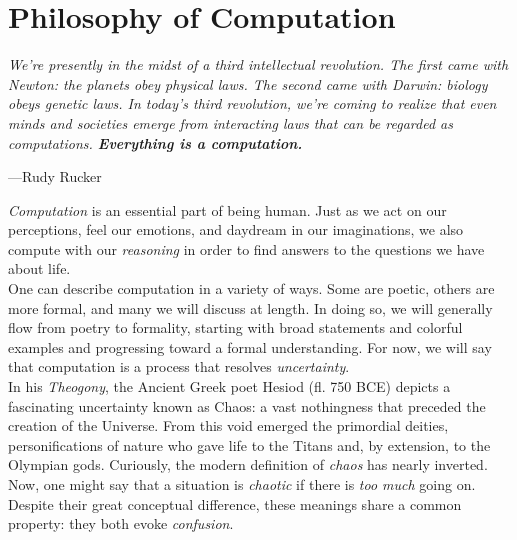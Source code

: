 
\part*{Philosophy of Computation}

\vspace{4mm}
\begin{displayquote}
	\textit{We're presently in the midst of a third intellectual revolution. The first came with Newton: the planets obey physical laws. The second came with Darwin: biology obeys genetic laws. In today’s third revolution, we're coming to realize that even minds and societies emerge from interacting laws that can be regarded as computations. \textbf{Everything is a computation.}}
	\begin{flushright}
		---Rudy Rucker
	\end{flushright}
\end{displayquote}
\vspace{4mm}

\textit{Computation} is an essential part of being human. Just as we act on our perceptions, feel our emotions, and daydream in our imaginations, we also compute with our \textit{reasoning} in order to find answers to the questions we have about life. \\

One can describe computation in a variety of ways. Some are poetic, others are more formal, and many we will discuss at length. In doing so, we will generally flow from poetry to formality, starting with broad statements and colorful examples and progressing toward a formal understanding. For now, we will say that computation is a process that resolves \textit{uncertainty}. \\

In his \textit{Theogony}, the Ancient Greek poet Hesiod (fl. 750 BCE) depicts a fascinating uncertainty known as Chaos: a vast nothingness that preceded the creation of the Universe. From this void emerged the primordial deities, personifications of nature who gave life to the Titans and, by extension, to the Olympian gods. Curiously, the modern definition of \textit{chaos} has nearly inverted. Now, one might say that a situation is \textit{chaotic} if there is \textit{too much} going on. Despite their great conceptual difference, these meanings share a common property: they both evoke \textit{confusion}. \\

